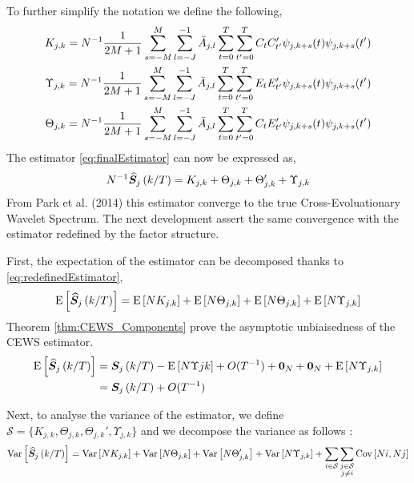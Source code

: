 \documentclass[main_document.tex]{subfiles}
\begin{document}
To further simplify the notation we define the following, 
\begin{align}
	K_{j,k} = N^{-1} \frac{\displaystyle 1}{\displaystyle 2M+1} \sum_{s=-M}^{M} \scalesum{l} \invA{j}{l} \locsum{t}\locsum{t'} C_t C_{t'}' \wavelet{j}{k+s}{t}\wavelet{j}{k+s}{t'} \label{eq:Kappa} \\
	\Upsilon_{j,k} = N^{-1} \frac{\displaystyle 1}{\displaystyle 2M+1} \sum_{s=-M}^{M} \scalesum{l} \invA{j}{l} \locsum{t}\locsum{t'} E_t E_{t'}' \wavelet{j}{k+s}{t}\wavelet{j}{k+s}{t'} \label{eq:Upsilon} \\
	\Theta_{j,k} = N^{-1} \frac{\displaystyle 1}{\displaystyle 2M+1} \sum_{s=-M}^{M} \scalesum{l} \invA{j}{l} \locsum{t}\locsum{t'} C_t E_{t'}' \wavelet{j}{k+s}{t}\wavelet{j}{k+s}{t'} \label{eq:Theta} 
\end{align}
The estimator \eqref{eq:finalEstimator} can now be expressed as, 
\begin{align}
	N^{-1} \widehat{\bm{S}}_{j}\left(k/T\right) = K_{j,k} + \Theta_{j,k} + \Theta_{j,k}' + \Upsilon_{j,k} \label{eq:redefinedEstimator}
\end{align}
From Park et al. (2014) this estimator converge to the true Cross-Evoluationary Wavelet Spectrum. The next development assert the same convergence with the estimator redefined by the factor structure. 

First, the expectation of the estimator can be decomposed thanks to \eqref{eq:redefinedEstimator},
\begin{align*}
	\mathrm{E}\left[\widehat{\bm{S}}_{j}\left(k/T\right)\right] = \mathrm{E}\left[N K_{j,k}\right] + \mathrm{E}\left[N \Theta_{j,k}\right] + \mathrm{E}\left[N \Theta_{j,k}\right] + \mathrm{E}\left[N \Upsilon_{j,k}\right]
\end{align*}
Theorem \ref{thm:CEWS_Components} prove the asymptotic unbiaisedness of the CEWS estimator.
\begin{align*}
	\mathrm{E}\left[\widehat{\bm{S}}_{j}\left(k/T\right)\right] &= \bm{S}_{j}\left(k/T\right) - \mathrm{E}\left[N\Upsilon{j}{k}\right] + O(T^{-1}) + \bm{0}_{N} + \bm{0}_{N} + \mathrm{E}\left[N \Upsilon_{j,k}\right] \\
				    &= \bm{S}_{j}\left(k/T\right) + O(T^{-1})
\end{align*}

Next, to analyse the variance of the estimator, we define $\mathcal{S} = \{ K_{j,k}, \Theta_{j,k}, \Theta_{j,k}', \Upsilon_{j,k} \}$ and we decompose the variance as follows : 
\begin{align}\label{eq:estimatorVariance}
	\Var{\estimCEWS{j}{k}} = \Var{N K_{j,k}} + \Var{N \Theta_{j,k}} + \Var{N \Theta_{j,k}'} + \Var{N \Upsilon_{j,k}} + \sum_{i \in \mathcal{S}} \sum_{\substack{j \in \mathcal{S} \\ j \neq i}} \Cov{Ni}{N j}
\end{align}
\end{document}
